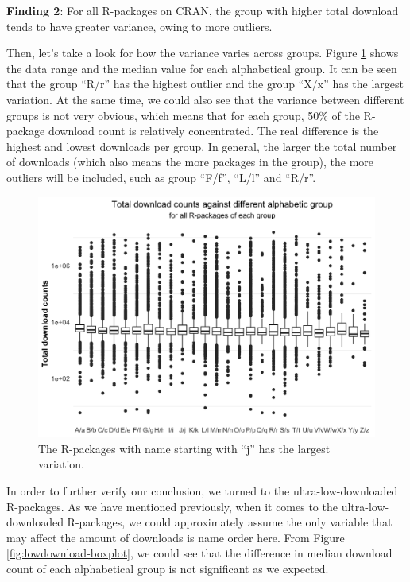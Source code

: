 \documentclass[
]{book}
\newenvironment{discovery}[1]{%
  \begin{tcolorbox}[colback=blue!30,colframe=blue!80!black]#1}{\end{tcolorbox}}
\begin{document}
\begin{discovery}
\textbf{Finding 2}: For all R-packages on CRAN, the group with higher
total download tends to have greater variance, owing to more outliers.
\end{discovery}

Then, let's take a look for how the variance varies across groups. Figure \ref{fig:all-boxplot} shows the data range and the median value for each alphabetical group. It can be seen that the group ``R/r'' has the highest outlier and the group ``X/x'' has the largest variation. At the same time, we could also see that the variance between different groups is not very obvious, which means that for each group, 50\% of the R-package download count is relatively concentrated. The real difference is the highest and lowest downloads per group. In general, the larger the total number of downloads (which also means the more packages in the group), the more outliers will be included, such as group ``F/f'', ``L/l'' and ``R/r''.



\begin{figure}

{\centering \includegraphics{figures/all-boxplot-1} 

}

\caption{The R-packages with name starting with ``j'' has the largest variation.}\label{fig:all-boxplot}
\end{figure}

In order to further verify our conclusion, we turned to the ultra-low-downloaded R-packages. As we have mentioned previously, when it comes to the ultra-low-downloaded R-packages, we could approximately assume the only variable that may affect the amount of downloads is name order here.
From Figure \ref{fig:lowdownload-boxplot}, we could see that the difference in median download count of each alphabetical group is not significant as we expected.
\end{document}
